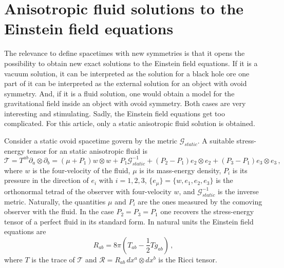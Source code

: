 \documentclass[12pt, ams, nofootinbib]{revtex4}
\def\be{\begin{equation}}
\def\ee{\end{equation}}
\newcommand{\rob}[1]{\left(#1\right)}    %
\theoremstyle{definition}
\begin{document}

\section{Anisotropic fluid solutions to the Einstein field equations}
\label{sec:solutions}
The relevance to define spacetimes with new symmetries is that it opens the possibility to obtain new exact solutions to the Einstein field equations. If it is a vacuum solution, it can be interpreted as the solution for a black hole ore one part of it can be interpreted as the external solution for an object with ovoid symmetry. And, if it is a fluid solution, one would obtain a model for the gravitational field inside an object with ovoid symmetry. Both cases are very interesting and stimulating. Sadly, the Einstein field equations get too complicated. For this article, only a static anisotropic fluid solution is obtained.

Consider a static ovoid spacetime govern by the metric $\mathcal{G}_{static}$. A suitable stress-energy tensor for an static anisotropic fluid is
\be
	\mathcal{T} = T^{ab} \partial_a\otimes \partial_b = (\mu+P_1)w\otimes w+P_1\mathcal{G}_{static}^{-1} + (P_2-P_1) e_2\otimes e_2 + (P_3-P_1)e_3\otimes e_3\,,
\ee
where $w$ is the four-velocity of the fluid, $\mu$ is its mass-energy density, $P_i$ is its pressure in the direction of $e_i$ with $i=1,2,3$, $\{e_\mu\}=\{w,e_1,e_2,e_3\}$ is the orthonormal tetrad of the observer with four-velocity $w$, and $\mathcal{G}_{static}^{-1}$ is the inverse metric. Naturally, the quantities $\mu$ and $P_i$ are the ones measured by the comoving observer with the fluid. In the case $P_2=P_3=P_1$ one recovers the stress-energy tensor of a perfect fluid in its standard form. In natural units the Einstein field equations are
\be
	R_{ab} = 8\pi\rob{ T_{ab}-\frac{1}{2}T g_{ab}}\,, \label{eq:EFE}
\ee
where $T$ is the trace of $\mathcal{T}$ and $\mathcal{R}=R_{ab}\,dx^a\otimes dx^b$ is the Ricci tensor. 
\end{document}
